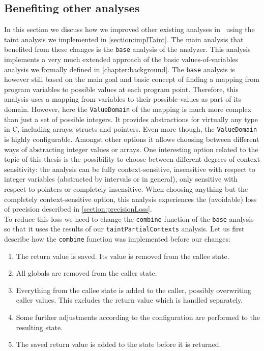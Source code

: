     \subsection{Benefiting other analyses}
    In this section we discuss how we improved other existing analyses in \gob\ using the taint analysis we implemented in \autoref{section:implTaint}. The main analysis that benefited from these changes is the \texttt{base} analysis of the analyzer. This analysis implements a very much extended approach of the basic values-of-variables analysis we formally defined in \autoref{chapter:background}. The \texttt{base} analysis is however still based on the main goal and basic concept of finding a mapping from program variables to possible values at each program point. Therefore, this analysis uses a mapping from variables to their possible values as part of its domain. However, here the \texttt{ValueDomain} of the mapping is much more complex than just a set of possible integers. It provides abstractions for virtually any type in C, including arrays, structs and pointers. Even more though, the \texttt{ValueDomain} is highly configurable. Amongst other options it allows choosing between different ways of abstracting integer values or arrays. One interesting option related to the topic of this thesis is the possibility to choose between different degrees of context sensitivity: the analysis can be fully context-sensitive, insensitive with respect to integer variables (abstracted by intervals or in general), only sensitive with respect to pointers or completely insensitive. When choosing anything but the completely context-sensitive option, this analysis experiences the (avoidable) loss of precision described in \autoref{section:precisionLoss}.\\
    To reduce this loss we need to change the \texttt{combine} function of the \texttt{base} analysis so that it uses the results of our \texttt{taintPartialContexts} analysis. Let us first describe how the \texttt{combine} function was implemented before our changes:
    \begin{enumerate}
      \item The return value is saved. Its value is removed from the callee state.
      \item All globals are removed from the caller state.
      \item Everything from the callee state is added to the caller, possibly overwriting caller values. This excludes the return value which is handled separately.
      \item Some further adjustments according to the configuration are performed to the resulting state.
      \item The saved return value is added to the state before it is returned.
    \end{enumerate}
